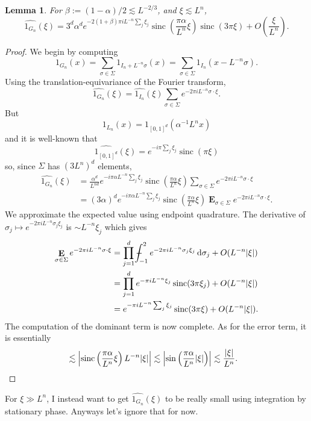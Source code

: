 \documentclass[reqno,10pt]{amsart}
\DeclareMathOperator*{\Expect}{\mathbf E}
\newcommand*\dif{\mathop{}\!\mathrm{d}}
\DeclareMathOperator{\sinc}{sinc}
\newtheorem{lemma}[theorem]{Lemma}
\theoremstyle{definition}
\numberwithin{equation}{section}
\def\Xint#1{\mathchoice
{\XXint\displaystyle\textstyle{#1}}%
{\XXint\textstyle\scriptstyle{#1}}%
{\XXint\scriptstyle\scriptscriptstyle{#1}}%
{\XXint\scriptscriptstyle\scriptscriptstyle{#1}}%
\!\int}
\def\XXint#1#2#3{{\setbox0=\hbox{$#1{#2#3}{\int}$ }
\vcenter{\hbox{$#2#3$ }}\kern-.6\wd0}}
\def\dashint{\Xint-}
\begin{document}
\begin{lemma}
For $\beta := (1 - \alpha)/2 \lesssim L^{-2/3}$, and $\xi \lesssim L^n$,
$$\widehat{1_{G_n}}(\xi) = 3^d \alpha^d e^{-2(1 + \beta) \pi i L^{-n} \sum_j \xi_j} \sinc\left(\frac{\pi \alpha}{L^n} \xi\right) \sinc(3\pi \xi) + O\left(\frac{\xi}{L^n}\right).$$
\end{lemma}
\begin{proof}
We begin by computing 
$$1_{G_n}(x) = \sum_{\sigma \in \Sigma} 1_{I_n + L^{-n}\sigma}(x) = \sum_{\sigma \in \Sigma} 1_{I_n}(x - L^{-n}\sigma).$$
Using the translation-equivariance of the Fourier transform,
$$\widehat{1_{G_n}}(\xi) = \widehat{1_{I_n}}(\xi) \sum_{\sigma \in \Sigma} e^{-2\pi iL^{-n} \sigma \cdot \xi}.$$
But
$$1_{L_n}(x) = 1_{[0, 1]^d}(\alpha^{-1} L^n x)$$
and it is well-known that 
$$\widehat{1_{[0, 1]^d}}(\xi) = e^{-i\pi \sum_j \xi_j} \sinc(\pi \xi)$$
so, since $\Sigma$ has $(3L^n)^d$ elements,
\begin{align*}
\widehat{1_{G_n}}(\xi)
&=\frac{\alpha^d}{L^{nd}} e^{-i\pi \alpha L^{-n} \sum_j \xi_j} \sinc\left(\frac{\pi \alpha}{L^n} \xi\right) \sum_{\sigma \in \Sigma} e^{-2\pi iL^{-n} \sigma \cdot \xi} \\
&= (3\alpha)^d e^{-i\pi \alpha L^{-n} \sum_j \xi_j} \sinc\left(\frac{\pi \alpha}{L^n} \xi\right) \Expect_{\sigma \in \Sigma} e^{-2\pi iL^{-n} \sigma \cdot \xi}.
\end{align*}
We approximate the expected value using endpoint quadrature. The derivative of $\sigma_j \mapsto e^{-2\pi iL^{-n} \sigma_j \xi_j}$ is $\sim L^{-n} \xi_j$ which gives 
\begin{align*}
\Expect_{\sigma \in \Sigma} e^{-2\pi iL^{-n} \sigma \cdot \xi}
&= \prod_{j=1}^d \dashint_{-1}^2 e^{-2\pi iL^{-n}\sigma_j \xi_j} \dif \sigma_j + O(L^{-n} |\xi|) \\
&= \prod_{j=1}^d e^{-\pi iL^{-n} \xi_j} \sinc(3\pi \xi_j) + O(L^{-n} |\xi|) \\
&= e^{-\pi i L^{-n} \sum_j \xi_j} \sinc(3\pi \xi) + O(L^{-n} |\xi|).
\end{align*}
The computation of the dominant term is now complete. As for the error term, it is essentially 
\begin{align*}
&\lesssim \left|\sinc\left(\frac{\pi \alpha}{L^n} \xi\right) L^{-n} |\xi|\right| \lesssim \left|\sin\left(\frac{\pi \alpha}{L^n} |\xi|\right)\right| \lesssim \frac{|\xi|}{L^n}. \qedhere
\end{align*}
\end{proof}

For $\xi \gg L^n$, I instead want to get $\widehat{1_{G_n}}(\xi)$ to be really small using integration by stationary phase. 
Anyways let's ignore that for now.
\end{document}
